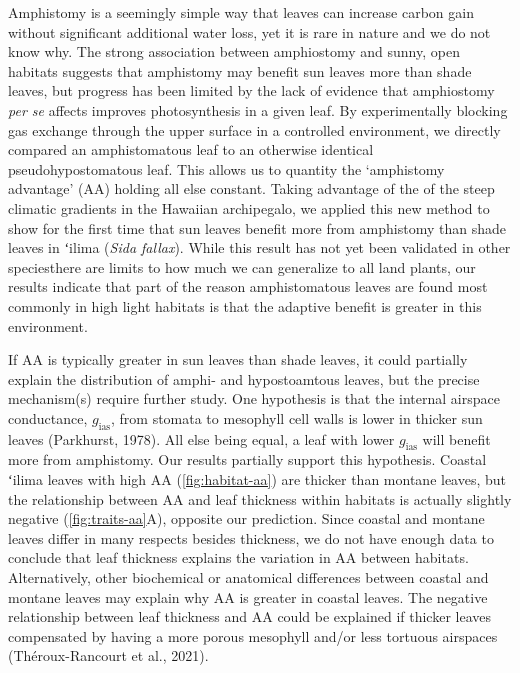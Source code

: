 \documentclass[
  letterpaper,
  DIV=11,
  numbers=noendperiod]{scrartcl}
\begin{document}
Amphistomy is a seemingly simple way that leaves can increase carbon
gain without significant additional water loss, yet it is rare in nature
and we do not know why. The strong association between amphiostomy and
sunny, open habitats suggests that amphistomy may benefit sun leaves
more than shade leaves, but progress has been limited by the lack of
evidence that amphiostomy \emph{per se} affects improves photosynthesis
in a given leaf. By experimentally blocking gas exchange through the
upper surface in a controlled environment, we directly compared an
amphistomatous leaf to an otherwise identical pseudohypostomatous leaf.
This allows us to quantity the `amphistomy advantage' (\(\mathrm{AA}\))
holding all else constant. Taking advantage of the of the steep climatic
gradients in the Hawaiian archipegalo, we applied this new method to
show for the first time that sun leaves benefit more from amphistomy
than shade leaves in ʻilima (\emph{Sida fallax}). While this result has
not yet been validated in other speciesthere are limits to how much we
can generalize to all land plants, our results indicate that part of the
reason amphistomatous leaves are found most commonly in high light
habitats is that the adaptive benefit is greater in this environment.

If \(\mathrm{AA}\) is typically greater in sun leaves than shade leaves,
it could partially explain the distribution of amphi- and hypostoamtous
leaves, but the precise mechanism(s) require further study. One
hypothesis is that the internal airspace conductance,
\(g_\mathrm{ias}\), from stomata to mesophyll cell walls is lower in
thicker sun leaves (Parkhurst, 1978). All else being equal, a leaf with
lower \(g_\mathrm{ias}\) will benefit more from amphistomy. Our results
partially support this hypothesis. Coastal ʻilima leaves with high
\(\mathrm{AA}\) (\autoref{fig:habitat-aa}) are thicker than montane
leaves, but the relationship between \(\mathrm{AA}\) and leaf thickness
within habitats is actually slightly negative
(\autoref{fig:traits-aa}A), opposite our prediction. Since coastal and
montane leaves differ in many respects besides thickness, we do not have
enough data to conclude that leaf thickness explains the variation in
\(\mathrm{AA}\) between habitats. Alternatively, other biochemical or
anatomical differences between coastal and montane leaves may explain
why \(\mathrm{AA}\) is greater in coastal leaves. The negative
relationship between leaf thickness and \(\mathrm{AA}\) could be
explained if thicker leaves compensated by having a more porous
mesophyll and/or less tortuous airspaces (Théroux-Rancourt et al.,
2021).
\end{document}
